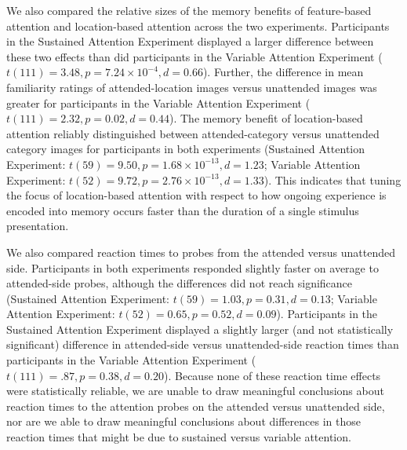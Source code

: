 \documentclass[english]{article}
\begin{document}
We also compared the relative sizes of the memory benefits of feature-based attention and location-based attention across the two experiments.  Participants in the Sustained Attention Experiment displayed a larger difference between these two effects than did participants in the Variable Attention Experiment ($t(111) = 3.48, p = 7.24 \times 10^{-4}, d = 0.66$).  Further, the difference in mean familiarity ratings of attended-location images versus unattended images was greater for participants in the Variable Attention Experiment ($t(111) = 2.32, p = 0.02, d = 0.44$). The memory benefit of location-based attention reliably distinguished between attended-category versus unattended category images for participants in both experiments (Sustained Attention Experiment: $t(59) = 9.50, p = 1.68 \times 10^{-13}, d = 1.23$; Variable Attention Experiment: $t(52) = 9.72, p = 2.76 \times 10^{-13}, d = 1.33$).  This indicates that tuning the focus of location-based attention with respect to how ongoing experience is encoded into memory occurs faster than the duration of a single stimulus presentation.

We also compared reaction times to probes from the attended versus unattended side.  Participants in both experiments responded slightly faster on average to attended-side probes, although the differences did not reach significance (Sustained Attention Experiment: $t(59) = 1.03, p = 0.31, d = 0.13$; Variable Attention Experiment: $t(52) = 0.65, p = 0.52, d = 0.09$).  Participants in the Sustained Attention Experiment displayed a slightly larger (and not statistically significant) difference in attended-side versus unattended-side reaction times than participants in the Variable Attention Experiment ($t(111) = .87, p = 0.38, d = 0.20$).  Because none of these reaction time effects were statistically reliable, we are unable to draw meaningful conclusions about reaction times to the attention probes on the attended versus unattended side, nor are we able to draw meaningful conclusions about differences in those reaction times that might be due to sustained versus variable attention.
\end{document}
